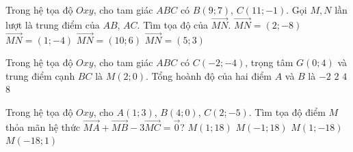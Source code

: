 \begin{ex}%
	Trong hệ  tọa độ $Oxy$, cho tam giác $ABC$ có $B(9; 7)$, $C(11;-1)$. Gọi $M, N$ lần lượt là trung điểm của $AB$, $A C$. Tìm tọa độ của $\overrightarrow{M N}$.
	 \choice
		 {$\overrightarrow{M N}=(2;-8)$}
		{\True  $\overrightarrow{M N}=(1;-4)$}
		{$\overrightarrow{M  N}=(10; 6)$}
		{$\overrightarrow{M  N}=(5; 3)$}
\end{ex}

\begin{ex}%
	Trong hệ tọa độ $Oxy$, cho tam giác $ABC$ có $C(-2;-4)$, trọng tâm $G(0; 4)$ và trung điểm cạnh $B C$ là $M(2; 0)$. Tổng hoành độ của hai  điểm $A$ và $B$ là
	\choice 
		{$  -2 $}
		{\True $ 2 $} 
		{$ 4 $} 
		{$  8 $}
\end{ex}

\begin{ex}%
	Trong hệ tọa độ  $Oxy$, cho $A(1; 3)$, $B(4; 0)$, $C(2;-5)$. Tìm tọa độ điểm $M$ thỏa mãn hệ thức $\overrightarrow{M A}+\overrightarrow{M B}-3 \overrightarrow{M C}=\overrightarrow{0}$?
	\choice 
		{$M(1; 18)$} 
		 {$M(-1; 18)$}
		 {\True $M(1;-18)$}
		{$M(-18; 1)$} 
\end{ex}

